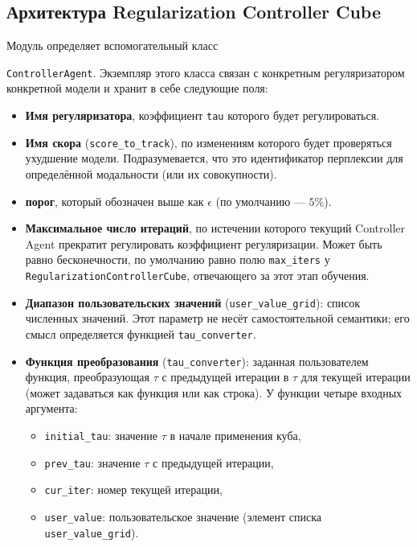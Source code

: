 \subsection{Архитектура Regularization Controller Cube} 

Модуль определяет вспомогательный класс

\texttt{ControllerAgent}. Экземпляр этого класса связан с конкретным регуляризатором конкретной модели и хранит в себе следующие поля: 

\begin{itemize}
    \item \textbf{Имя регуляризатора}, коэффициент \texttt{tau} которого будет регулироваться.
    \item \textbf{Имя скора} (\texttt{score\_to\_track}), по изменениям которого будет проверяться ухудшение модели. Подразумевается, что это идентификатор перплексии для определённой модальности (или их совокупности).
    \item \textbf{порог}, который обозначен выше как $\epsilon$ (по умолчанию --- $5\%$).
    \item \textbf{Максимальное число итераций}, по истечении которого текущий Controller Agent  прекратит регулировать коэффициент регуляризации. Может быть равно бесконечности, по умолчанию равно полю \texttt{max\_iters} у  \texttt{RegularizationControllerCube}, отвечающего за этот этап обучения.
    \item \textbf{Диапазон пользовательских значений} (\texttt{user\_value\_grid}): список численных значений. Этот параметр не несёт самостоятельной семантики; его смысл определяется функцией \texttt{tau\_converter}.
    \item \textbf{Функция преобразования} (\texttt{tau\_converter}): заданная пользователем функция, преобразующая $\tau$ с предыдущей итерации в $\tau$ для текущей итерации (может задаваться как функция или как строка). У функции четыре входных аргумента:
    \begin{itemize}
        \item \texttt{initial\_tau}: значение $\tau$ в начале применения куба,
        \item \texttt{prev\_tau}: значение $\tau$ с предыдущей итерации,
        \item  \texttt{cur\_iter}: номер текущей итерации,
        \item \texttt{user\_value}: пользовательское значение (элемент списка \texttt{user\_value\_grid}).
    \end{itemize}
\end{itemize} 

